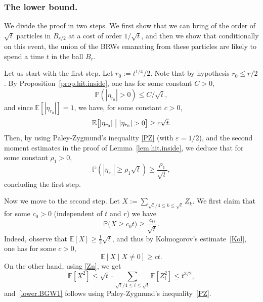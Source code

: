 \documentclass[11pt]{article}
\numberwithin{equation}{section}
\theoremstyle{plain}
\theoremstyle{definition}
\newcommand{\1}{{\text{\Large $\mathfrak 1$}}}
\let\epsilon\varepsilon
\begin{document}
\subsubsection*{The lower bound.}
We divide the proof in two steps.
We first show that we can bring of the order of $\sqrt t$
particles in $B_{r/2}$ at a cost of order $1/\sqrt t$,
and then we show that conditionally on this event, the union of the BRWs emanating from these particles are likely to spend a time $t$ in the ball $B_r$.

Let us start with the first step. Let $r_0 := t^{1/4}/2$. Note that by hypothesis $r_0 \le r/2$.
By Proposition~\ref{prop.hit.inside}, one has for some constant $C>0$,
\[
\mathbb P(|\eta_{r_0}|> 0) \le C/\sqrt t,
\]
and since $\mathbb E[|\eta_{r_0}|]=1$,
we have, for some constant $c>0$,
\[
\mathbb E\big[|\eta_{r_0}|\bigm| |\eta_{r_0}|> 0\big]\ge
c\sqrt t.
\]
Then, by using Paley-Zygmund's inequality \eqref{PZ} (with $\epsilon=1/2$),
and the second
moment estimates in the proof of Lemma~\ref{lem.hit.inside}, we deduce that for some constant $\rho_1>0$,
\begin{equation}\label{lower.1st}
\mathbb P(|\eta_{r_0}|\ge \rho_1\sqrt t) \ge \frac{\rho_1}{\sqrt t},
\end{equation}
concluding the first step.

Now we move to the second step.
Let $X:=\sum_{\sqrt t/4\le k\le {\sqrt t} } Z_k$.
We first claim that for some $c_0>0$ (independent of $t$ and $r$) we have
\begin{equation}\label{lower.BGW1}
\mathbb P\big(X \ge c_0 t\big) \ge\frac{c_0}{\sqrt t}.
\end{equation}
Indeed, observe that $\mathbb E[X] \ge \frac{1}{2}\sqrt t$, and
thus by Kolmogorov's estimate~\eqref{Kol}, one has for some $c>0$,
\[
\mathbb E[X\mid X\neq 0] \ge ct.
\]
On the other hand, using \eqref{Zn}, we get
\[
\mathbb E[X^2] \le \sqrt t\cdot
\sum_{\sqrt t/4\le i\le \sqrt t}
\mathbb E[Z_i^2] \le t^{3/2},
\]
and~\eqref{lower.BGW1} follows using Paley-Zygmund's inequality~\eqref{PZ}.
\end{document}

